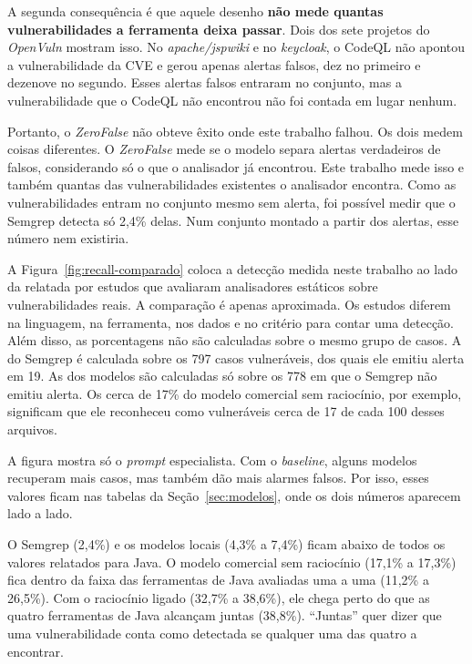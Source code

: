 A segunda consequência é que aquele desenho \textbf{não mede quantas vulnerabilidades a ferramenta deixa passar}. Dois dos sete projetos do \textit{OpenVuln} mostram isso. No \textit{apache/jspwiki} e no \textit{keycloak}, o CodeQL não apontou a vulnerabilidade da CVE e gerou apenas alertas falsos, dez no primeiro e dezenove no segundo. Esses alertas falsos entraram no conjunto, mas a vulnerabilidade que o CodeQL não encontrou não foi contada em lugar nenhum.

Portanto, o \textit{ZeroFalse} não obteve êxito onde este trabalho falhou. Os dois medem coisas diferentes. O \textit{ZeroFalse} mede se o modelo separa alertas verdadeiros de falsos, considerando só o que o analisador já encontrou. Este trabalho mede isso e também quantas das vulnerabilidades existentes o analisador encontra. Como as vulnerabilidades entram no conjunto mesmo sem alerta, foi possível medir que o Semgrep detecta só 2,4\% delas. Num conjunto montado a partir dos alertas, esse número nem existiria.

A Figura~\ref{fig:recall-comparado} coloca a detecção medida neste trabalho ao lado da relatada por estudos que avaliaram analisadores estáticos sobre vulnerabilidades reais. A comparação é apenas aproximada. Os estudos diferem na linguagem, na ferramenta, nos dados e no critério para contar uma detecção. Além disso, as porcentagens não são calculadas sobre o mesmo grupo de casos. A do Semgrep é calculada sobre os 797 casos vulneráveis, dos quais ele emitiu alerta em 19. As dos modelos são calculadas só sobre os 778 em que o Semgrep não emitiu alerta. Os cerca de 17\% do modelo comercial sem raciocínio, por exemplo, significam que ele reconheceu como vulneráveis cerca de 17 de cada 100 desses arquivos.

A figura mostra só o \textit{prompt} especialista. Com o \textit{baseline}, alguns modelos recuperam mais casos, mas também dão mais alarmes falsos. Por isso, esses valores ficam nas tabelas da Seção~\ref{sec:modelos}, onde os dois números aparecem lado a lado.

O Semgrep (2,4\%) e os modelos locais (4,3\% a 7,4\%) ficam abaixo de todos os valores relatados para Java. O modelo comercial sem raciocínio (17,1\% a 17,3\%) fica dentro da faixa das ferramentas de Java avaliadas uma a uma (11,2\% a 26,5\%). Com o raciocínio ligado (32,7\% a 38,6\%), ele chega perto do que as quatro ferramentas de Java alcançam juntas (38,8\%). ``Juntas'' quer dizer que uma vulnerabilidade conta como detectada se qualquer uma das quatro a encontrar.

